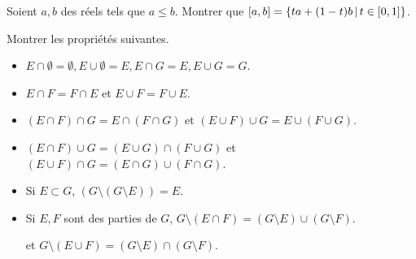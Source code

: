 \begin{rlined}
    \begin{exo}
        Soient $a, b$ des réels tels que $a \leq b$. Montrer que $[a, b] = \{ta+(1-t)b\,\vert\, t \in [0, 1]\}$. 
    \end{exo}
    \begin{exo}
        Montrer les propriétés suivantes.
        \begin{itemize}
            \item $E \cap \emptyset = \emptyset, E\cup\emptyset = E, E\cap G = E, E\cup G = G$.
            \item $E \cap F = F \cap E$ et $E \cup F = F \cup E$.
            \item $(E \cap F) \cap G = E \cap (F \cap G)$ et $(E \cup F) \cup G = E \cup (F \cup G)$.
            \item $(E \cap F) \cup G = (E \cup G) \cap (F \cup G)$ et $(E \cup F) \cap G = (E \cap G) \cup (F \cap G)$.
            \item Si $E \subset G$, $(G \setminus (G \setminus E)) = E$.
            \item Si $E, F$ sont des parties de $G$, $G \setminus (E \cap F) = (G \setminus E) \cup (G \setminus F)$.
            
            et $G \setminus (E \cup F) = (G \setminus E) \cap (G \setminus F)$.
        \end{itemize}
    \end{exo}
\end{rlined}


